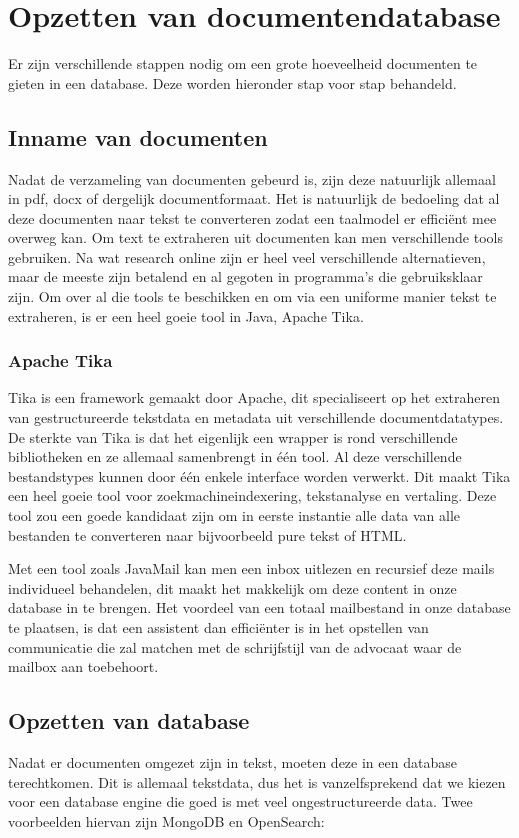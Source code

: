 \chapter{Opzetten van documentendatabase}
Er zijn verschillende stappen nodig om een grote hoeveelheid documenten te gieten in een database.
Deze worden hieronder stap voor stap behandeld.

\section{Inname van documenten}
Nadat de verzameling van documenten gebeurd is, zijn deze natuurlijk allemaal in pdf, docx of dergelijk documentformaat.
Het is natuurlijk de bedoeling dat al deze documenten naar tekst te converteren zodat een taalmodel er efficiënt mee overweg kan.
Om text te extraheren uit documenten kan men verschillende tools gebruiken.
Na wat research online zijn er heel veel verschillende alternatieven, maar de meeste zijn betalend en al gegoten in programma's die gebruiksklaar zijn.
Om over al die tools te beschikken en om via een uniforme manier tekst te extraheren, is er een heel goeie tool in Java, Apache Tika.

\subsection{Apache Tika}
Tika is een framework gemaakt door Apache, dit specialiseert op het extraheren van gestructureerde tekstdata en metadata uit verschillende documentdatatypes.
De sterkte van Tika is dat het eigenlijk een wrapper is rond verschillende bibliotheken en ze allemaal samenbrengt in één tool.
Al deze verschillende bestandstypes kunnen door één enkele interface worden verwerkt.
Dit maakt Tika een heel goeie tool voor zoekmachineindexering, tekstanalyse en vertaling.
Deze tool zou een goede kandidaat zijn om in eerste instantie alle data van alle bestanden te converteren naar bijvoorbeeld pure tekst of HTML.

Met een tool zoals JavaMail kan men een inbox uitlezen en recursief deze mails individueel behandelen, dit maakt het makkelijk om deze content in onze database in te brengen.
Het voordeel van een totaal mailbestand in onze database te plaatsen,
is dat een assistent dan efficiënter is in het opstellen van communicatie die zal matchen met de schrijfstijl van de advocaat waar de mailbox aan toebehoort.

\section{Opzetten van database}
Nadat er documenten omgezet zijn in tekst, moeten deze in een database terechtkomen.
Dit is allemaal tekstdata, dus het is vanzelfsprekend dat we kiezen voor een database engine die goed is met veel ongestructureerde data.
Twee voorbeelden hiervan zijn MongoDB en OpenSearch:

